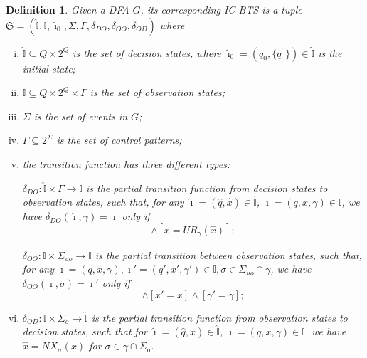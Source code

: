 \documentclass[twocolumn]{autart}
\newtheorem{mydef}{\bf Definition}
\begin{document}
\begin{mydef}\label{def:bcc}
Given a DFA $G$, its corresponding IC-BTS is a tuple
$
\mathfrak{S} = (\hat{\mathbb{I}}, \mathbb{I}, \hat{\imath}_0, \Sigma, \Gamma, \delta_{DO}, \delta_{OO}, \delta_{OD})
$
where
\begin{enumerate}[(i)]
    \item 
    $\hat{\mathbb{I}} \subseteq Q \times 2^Q$ is the set of  \emph{decision states}, 
    where $\hat{\imath}_0 = ( q_0,\{ q_0 \}) \in \hat{\mathbb{I}}$ is the initial state; 
    \item 
    $\mathbb{I}  \subseteq Q \times 2^Q\times \Gamma$ is the set of  \emph{observation states};
    \item 
    $\Sigma$ is the set of events in $G$;
    \item
    $\Gamma \subseteq 2^{\Sigma}$ is the set of control patterns; 
    \item 
    the transition function has three different types: 
    
    $\delta_{DO} : \hat{\mathbb{I}} \times \Gamma \rightarrow \mathbb{I}$ is the partial transition function from decision states to observation states, such that, for any
    $\hat{\imath} = (\hat{q}, \hat{x}) \in \hat{\mathbb{I}}$, 
    $\imath = ({q}, {x},\gamma) \in {\mathbb{I}}$,
    we have $\delta_{DO}(\hat{\imath},\gamma)=\imath$ only if 
    \begin{equation}
        [q=\hat{q}] \wedge [{x} = UR_{\gamma}(\hat{x})];
    \end{equation}
    
    $\delta_{OO} : \mathbb{I} \times \Sigma_{uo} \rightarrow \mathbb{I}$ is the partial transition between observation states, such that, for any
    $\imath = ({q}, {x},\gamma),\imath' = ({q}', {x}',\gamma')  \in {\mathbb{I}},\sigma\in\Sigma_{uo}\cap\gamma$,
    we have $\delta_{OO}({\imath},\sigma)=\imath'$ only if 
    \begin{equation}
        [q'=\delta(q,\sigma)] \wedge [x'=x]  \wedge [\gamma'=\gamma];
    \end{equation}

    \item $\delta_{OD} : \mathbb{I} \times \Sigma_o \rightarrow \hat{\mathbb{I}}$ is the partial transition function from observation states to decision states, such that for $\hat{\imath} = (\hat{q}, \hat{x}) \in \hat{\mathbb{I}}$, $\imath = ({q}, {x},\gamma) \in {\mathbb{I}}$, we have $\hat{x} = NX_{\sigma}({x})$ for $\sigma \in \gamma \cap \Sigma_o$.

    
\end{enumerate}
\end{mydef}
\end{document}
